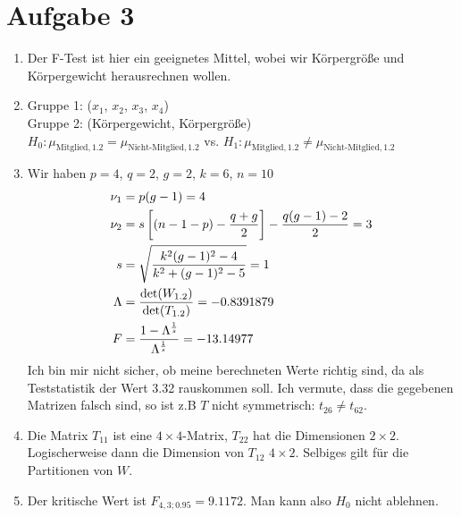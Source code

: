\documentclass{article}
\begin{document}
	\section*{Aufgabe 3}
	\begin{enumerate}[label=(\alph*)]
		\item Der F-Test ist hier ein geeignetes Mittel, wobei wir Körpergröße und Körpergewicht herausrechnen wollen.
		\item Gruppe 1: ($x_1$, $x_2$, $x_3$, $x_4$) \\
		Gruppe 2: (Körpergewicht, Körpergröße) \\
		$H_0: \mu_{\text{Mitglied},1.2} = \mu_{\text{Nicht-Mitglied},1.2}$ vs. $H_1: \mu_{\text{Mitglied},1.2} \neq \mu_{\text{Nicht-Mitglied},1.2}$
		\item Wir haben $p=4$, $q=2$, $g=2$, $k=6$, $n=10$
		\begin{align}
			\nu_1 &= p(g-1) = 4 \notag \\
			\nu_2 &= s\left[(n-1-p)-\frac{q+g}{2}\right] - \frac{q(g-1)-2}{2} = 3 \notag \\
			s &= \sqrt{\frac{k^2(g-1)^2-4}{k^2+(g-1)^2-5}} = 1 \notag \\
			\Lambda &= \frac{\det(W_{1.2})}{\det(T_{1.2})} = -0.8391879 \notag \\
			F &= \frac{1-\Lambda^{\frac{1}{s}}}{\Lambda^{\frac{1}{s}}} = -13.14977 \notag
		\end{align}
		Ich bin mir nicht sicher, ob meine berechneten Werte richtig sind, da als Teststatistik der Wert 3.32 rauskommen soll. Ich vermute, dass die gegebenen Matrizen falsch sind, so ist z.B $T$ nicht symmetrisch: $t_{26}\neq t_{62}$.
		\item Die Matrix $T_{11}$ ist eine $4\times 4$-Matrix, $T_{22}$ hat die Dimensionen $2\times 2$. Logischerweise dann die Dimension von $T_{12}$ $4\times 2$. Selbiges gilt für die Partitionen von $W$.
		\item Der kritische Wert ist $F_{4,3;0.95}=9.1172$. Man kann also $H_0$ nicht ablehnen.
	\end{enumerate}
\end{document}

